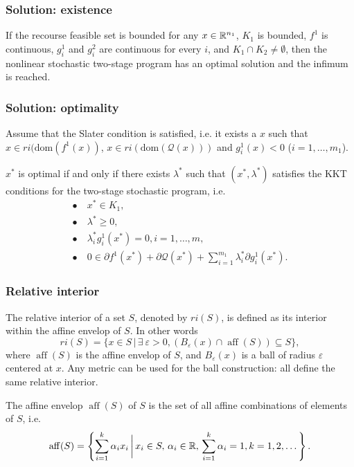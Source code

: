 \documentclass[french]{beamer}
\def\aff{\operatorname{aff}}
\begin{document}
\begin{frame}
\frametitle{Solution: existence}

\begin{theorem}
	If the recourse feasible set is bounded for any $x \in \mathbb{R}^{n_1}$, $K_1$ is bounded, $f^1$ is continuous, $g_i^1$ and $g_i^2$ are continuous for every $i$, and $K_1 \cap K_2 \ne \emptyset$,
	then the nonlinear stochastic two-stage program has an optimal solution and the infimum is reached.
\end{theorem}

\end{frame}

\begin{frame}
\frametitle{Solution: optimality}

\begin{theorem}
Assume that the Slater condition is satisfied, i.e. it exists a $x$ such that $x \in ri(\mbox{dom}(f^1(x))$, $x \in ri(\mbox{dom}(\mathcal{Q}(x)))$ and $g_i^1(x) < 0$ ($i = 1,\ldots,m_1$).

$x^*$ is optimal if and only if there exists $\lambda^*$ such that $(x^*, \lambda^*)$ satisfies the KKT conditions for the two-stage stochastic program, i.e.
\begin{align*}
\bullet\ & x^* \in K_1, \\
\bullet\ & \lambda^* \geq 0, \\ 
\bullet\ & \lambda_i^*g_i^1(x^*) = 0, i = 1,\ldots,m, \\
\bullet\ & 0 \in \partial f^1(x^*) + \partial \mathcal{Q}(x^*) +
 \sum_{i=1}^{m_1}\lambda_i^* \partial g_i^1(x^*).
\end{align*}
\end{theorem}

\end{frame}


\begin{frame}
	\frametitle{Relative interior}
	
	The {\red relative interior} of a set $S$, denoted by $ri(S)$, is defined as its interior within the affine envelop of $S$.
	In other words
	\[
	ri(S) = \lbrace x \in S \,|\, \exists\ \varepsilon > 0, (B_{\varepsilon}(x)
	\cap \aff(S)) \subseteq S \rbrace,
	\]
	where $\aff(S)$ is the {\red affine envelop} of $S$, and $B_{\varepsilon}(x)$
	is a ball of radius ${\varepsilon}$ centered at $x$.
	Any metric can be used for the ball construction: all define the same relative interior.
	
	\mbox{}
	
	The {\red affine envelop} $\aff(S)$ of $S$ is the set of all affine combinations of elements of $S$, i.e.
	\[
	\operatorname{aff} (S)=\left\lbrace \sum_{i=1}^k \alpha_i x_i \,\bigg|\,
	x_i\in S, \, \alpha_i\in \mathbb{R}, \, \sum_{i=1}^k \alpha_i=1,
	k=1, 2, \dots\right\rbrace. 
	\]
\end{frame}
\end{document}
